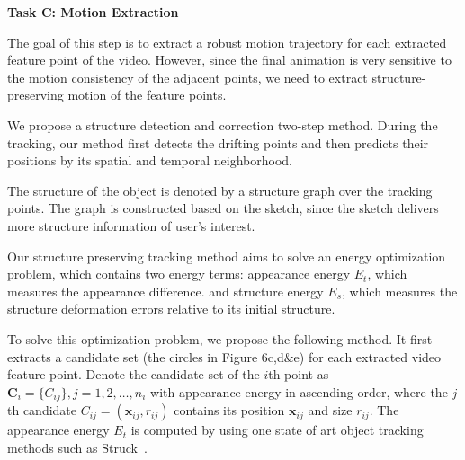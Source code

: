 \textbf{Task C: Motion Extraction}


The goal of this step is to extract a robust motion trajectory for each extracted feature point of the video. However, since the final animation is very sensitive to the motion consistency of the adjacent points, we need to extract structure-preserving motion of the feature points.

We propose a structure detection and correction two-step method. During the tracking, our method first detects the drifting points and then predicts their positions by its spatial and temporal neighborhood.

The structure of the object is denoted by a structure graph over the tracking points.
The graph is constructed based on the sketch, since the sketch delivers more structure information of user's interest. 

Our structure preserving tracking method aims to solve an energy optimization problem, which contains two energy terms:
appearance energy $ E_t $, which measures the appearance difference. %
and structure energy $ E_s $, which measures the structure deformation errors relative to its initial structure.

To solve this optimization problem, we propose the following method. 
It first extracts a candidate set (the circles in Figure 6c,d\&e) for each extracted video feature point. Denote the candidate set of the $ i $th point as $ \mathbf{C}_i  = \{C_{ij}\}, j = 1, 2, \ldots, n_i $  with appearance energy in ascending order, where the $ j $th candidate $ C_{ij} = (\mathbf{x}_{ij}, r_{ij}) $ contains its position $ \mathbf{x}_{ij} $ and size $ r_{ij} $.
The appearance energy $ E_t $ is computed by using one state of art object tracking methods such as Struck~\cite{6126251}.

